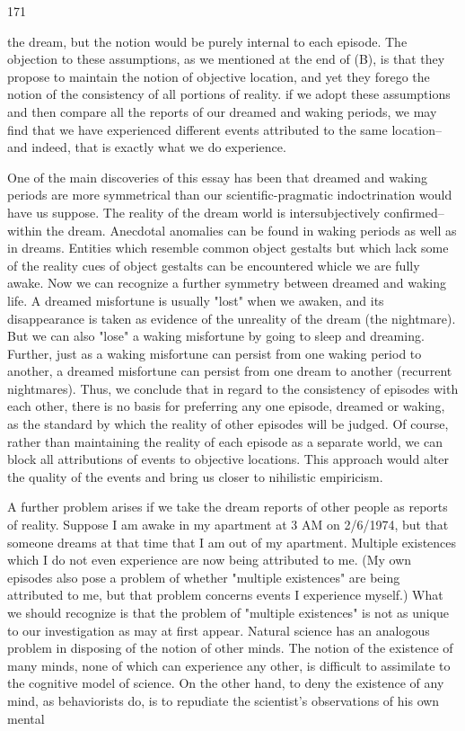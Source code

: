 \documentclass[10pt,twoside]{memoir}
\begin{document}
\begin{enumerate}
{\begin{enumerate}
\begin{sysrules}
\begin{sysrules}
\begin{sysrules}
\begin{sysrules}
{\begin{enumerate}
{{{{{{{171 


the dream, but the notion would be purely internal to each episode. The 
objection to these assumptions, as we mentioned at the end of (B), is that 
they propose to maintain the notion of objective location, and yet they 
forego the notion of the consistency of all portions of reality. if we adopt 
these assumptions and then compare all the reports of our dreamed and 
waking periods, we may find that we have experienced different events 
attributed to the same location--and indeed, that is exactly what we do 
experience. 

One of the main discoveries of this essay has been that dreamed and 
waking periods are more symmetrical than our scientific-pragmatic 
indoctrination would have us suppose. The reality of the dream world is 
intersubjectively confirmed--within the dream. Anecdotal anomalies can be 
found in waking periods as well as in dreams. Entities which resemble 
common object gestalts but which lack some of the reality cues of object 
gestalts can be encountered whicle we are fully awake. Now we can 
recognize a further symmetry between dreamed and waking life. A dreamed 
misfortune is usually "lost" when we awaken, and its disappearance is taken 
as evidence of the unreality of the dream (the nightmare). But we can also 
"lose" a waking misfortune by going to sleep and dreaming. Further, just as 
a waking misfortune can persist from one waking period to another, a 
dreamed misfortune can persist from one dream to another (recurrent 
nightmares). Thus, we conclude that in regard to the consistency of episodes 
with each other, there is no basis for preferring any one episode, dreamed or 
waking, as the standard by which the reality of other episodes will be judged. 
Of course, rather than maintaining the reality of each episode as a separate 
world, we can block all attributions of events to objective locations. This 
approach would alter the quality of the events and bring us closer to 
nihilistic empiricism. 

A further problem arises if we take the dream reports of other people as 
reports of reality. Suppose I am awake in my apartment at 3 AM on 
2/6/1974, but that someone dreams at that time that I am out of my 
apartment. Multiple existences which I do not even experience are now being 
attributed to me. (My own episodes also pose a problem of whether 
"multiple existences" are being attributed to me, but that problem concerns 
events I experience myself.) What we should recognize is that the problem of 
"multiple existences" is not as unique to our investigation as may at first 
appear. Natural science has an analogous problem in disposing of the notion 
of other minds. The notion of the existence of many minds, none of which 
can experience any other, is difficult to assimilate to the cognitive model of 
science. On the other hand, to deny the existence of any mind, as 
behaviorists do, is to repudiate the scientist's observations of his own mental 


}}}}}}}
\end{enumerate}}
\end{sysrules}
\end{sysrules}
\end{sysrules}
\end{sysrules}
\end{enumerate}}
\end{enumerate}
\end{document}

